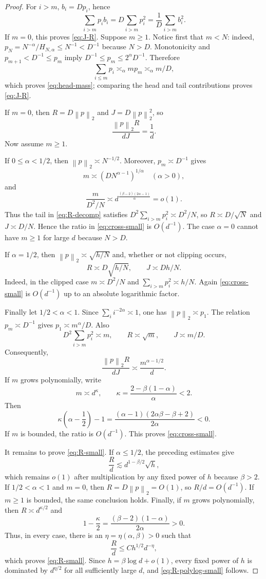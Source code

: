 \documentclass[11pt]{article}
\theoremstyle{remark}
\newcommand{\norm}[1]{\left\lVert #1\right\rVert}
\newcommand{\1}{\mathbf 1}
\begin{document}
\begin{proof}
For $i>m$, $b_i=Dp_i$, hence
\[
 \sum_{i>m}p_ib_i
 =D\sum_{i>m}p_i^2
 =\frac1D\sum_{i>m}b_i^2.
\]
If $m=0$, this proves \eqref{eq:J-R}.  Suppose $m\geq1$.  Notice first
that $m<N$: indeed,
$p_N=N^{-\alpha}/H_{N,\alpha}\leq N^{-1}<D^{-1}$ because $N>D$.
Monotonicity and $p_{m+1}<D^{-1}\leq p_m$ imply
$D^{-1}\leq p_m\leq 2^\alpha D^{-1}$.  Therefore
\[
 \sum_{i\leq m}p_i\asymp_\alpha mp_m\asymp_\alpha m/D,
\]
which proves \eqref{eq:head-mass}; comparing the head and tail
contributions proves \eqref{eq:J-R}.

If $m=0$, then $R=D\norm p_2$ and $J=D\norm p_2^2$, so
\[
 \frac{\norm p_2R}{dJ}=\frac1d.
\]
Now assume $m\geq1$.

If $0\leq\alpha<1/2$, then $\norm p_2\asymp N^{-1/2}$.  Moreover,
$p_m\asymp D^{-1}$ gives
\[
 m\asymp(DN^{\alpha-1})^{1/\alpha}
 \quad(\alpha>0),
\]
and
\[
 \frac{m}{D^2/N}
 \asymp d^{\frac{(\beta-2)(2\alpha-1)}{\alpha}}=o(1).
\]
Thus the tail in \eqref{eq:R-decomp} satisfies
$D^2\sum_{i>m}p_i^2\asymp D^2/N$, so
$R\asymp D/\sqrt N$ and $J\asymp D/N$.  Hence the ratio in
\eqref{eq:cross-small} is $O(d^{-1})$.  The case $\alpha=0$ cannot
have $m\geq1$ for large $d$ because $N>D$.

If $\alpha=1/2$, then
$\norm p_2\asymp\sqrt{h/N}$ and, whether or not clipping occurs,
\[
 R\asymp D\sqrt{h/N},
 \qquad
 J\asymp Dh/N.
\]
Indeed, in the clipped case $m\asymp D^2/N$ and
$\sum_{i>m}p_i^2\asymp h/N$.  Again
\eqref{eq:cross-small} is $O(d^{-1})$ up to an absolute logarithmic
factor.

Finally let $1/2<\alpha<1$.  Since
$\sum_i i^{-2\alpha}\asymp1$, one has
$\norm p_2\asymp p_1$.  The relation $p_m\asymp D^{-1}$ gives
$p_1\asymp m^\alpha/D$.  Also
\[
 D^2\sum_{i>m}p_i^2\asymp m,
 \qquad R\asymp\sqrt m,
 \qquad J\asymp m/D.
\]
Consequently,
\[
 \frac{\norm p_2R}{dJ}\asymp\frac{m^{\alpha-1/2}}d.
\]
If $m$ grows polynomially, write
\[
 m\asymp d^\kappa,
 \qquad
 \kappa=\frac{2-\beta(1-\alpha)}{\alpha}<2.
\]
Then
\[
 \kappa\left(\alpha-\frac12\right)-1
 =\frac{(\alpha-1)(2\alpha\beta-\beta+2)}{2\alpha}<0.
\]
If $m$ is bounded, the ratio is $O(d^{-1})$.  This proves
\eqref{eq:cross-small}.

It remains to prove \eqref{eq:R-small}.  If $\alpha\leq1/2$, the
preceding estimates give
\[
 \frac Rd\lesssim d^{1-\beta/2}\sqrt h,
\]
which remains $o(1)$ after multiplication by any fixed power of $h$
because $\beta>2$.  If $1/2<\alpha<1$ and $m=0$, then
$R=D\norm{p}_2=O(1)$, so $R/d=O(d^{-1})$.  If $m\geq1$ is bounded,
the same conclusion holds.  Finally, if $m$ grows polynomially, then
$R\asymp d^{\kappa/2}$ and
\[
 1-\frac\kappa2
 =\frac{(\beta-2)(1-\alpha)}{2\alpha}>0.
\]
Thus, in every case, there is an
$\eta=\eta(\alpha,\beta)>0$ such that
\[
 \frac Rd\leq Ch^{1/2}d^{-\eta},
\]
which proves \eqref{eq:R-small}.  Since $h=\beta\log d+o(1)$, every
fixed power of $h$ is dominated by $d^{\eta/2}$ for all sufficiently
large $d$, and \eqref{eq:R-polylog-small} follows.
\end{proof}
\end{document}
